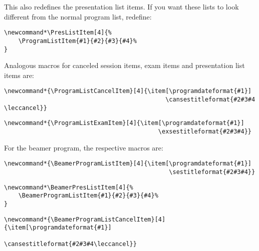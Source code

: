 \documentclass[english]{article}
\begin{document}
%
This also redefines the presentation list items. 
If you want these lists to look different from the normal program list, redefine:
\begin{lstlisting}[language={[LaTeX]TeX},basicstyle={\small\ttfamily},
frame=single,moretexcs={[2]{PresListItem,ProgramListItem}}]
\newcommand*\PresListItem[4]{%
    \ProgramListItem{#1}{#2}{#3}{#4}%
}
\end{lstlisting}
%
Analogous macros for canceled session items, exam items and presentation list items are:
\begin{lstlisting}[language={[LaTeX]TeX},basicstyle={\small\ttfamily},
frame=single,moretexcs={[3]{ProgramListCancelItem,programdateformat,cansestitleformat}}]
\newcommand*{\ProgramListCancelItem}[4]{\item[\programdateformat{#1}]
                                             \cansestitleformat{#2#3#4 \leccancel}}
\end{lstlisting}
\begin{lstlisting}[language={[LaTeX]TeX},basicstyle={\small\ttfamily},
frame=single,moretexcs={[3]{ProgramListExamItem,programdateformat,exsestitleformat}}]
\newcommand*{\ProgramListExamItem}[4]{\item[\programdateformat{#1}]
                                           \exsestitleformat{#2#3#4}}
\end{lstlisting}
%
For the beamer program, the respective macros are:
\begin{lstlisting}[language={[LaTeX]TeX},basicstyle={\small\ttfamily},
frame=single,moretexcs={[3]{BeamerProgramListItem,programdateformat,sestitleformat}}]
\newcommand*{\BeamerProgramListItem}[4]{\item[\programdateformat{#1}]
                                              \sestitleformat{#2#3#4}}
\end{lstlisting}
\begin{lstlisting}[language={[LaTeX]TeX},basicstyle={\small\ttfamily},
frame=single,moretexcs={[2]{BeamerPresListItem,BeamerProgramListItem}}]
\newcommand*\BeamerPresListItem[4]{%
    \BeamerProgramListItem{#1}{#2}{#3}{#4}%
}
\end{lstlisting}
\begin{lstlisting}[language={[LaTeX]TeX},basicstyle={\small\ttfamily},
frame=single,moretexcs={[3]{BeamerProgramListCancelItem,programdateformat,cansestitleformat}}]
\newcommand*{\BeamerProgramListCancelItem}[4]{\item[\programdateformat{#1}]
                                              \cansestitleformat{#2#3#4\leccancel}}
\end{lstlisting}
\end{document}
